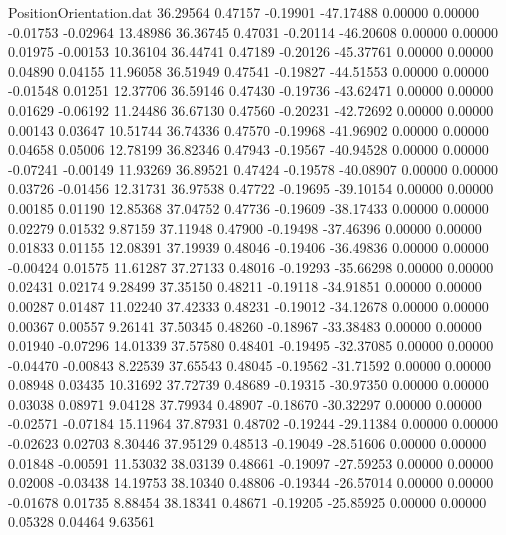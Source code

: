 \begin{filecontents}{PositionOrientation.dat}
  36.29564    0.47157   -0.19901   -47.17488    0.00000    0.00000   -0.01753   -0.02964   13.48986
  36.36745    0.47031   -0.20114   -46.20608    0.00000    0.00000    0.01975   -0.00153   10.36104
  36.44741    0.47189   -0.20126   -45.37761    0.00000    0.00000    0.04890    0.04155   11.96058
  36.51949    0.47541   -0.19827   -44.51553    0.00000    0.00000   -0.01548    0.01251   12.37706
  36.59146    0.47430   -0.19736   -43.62471    0.00000    0.00000    0.01629   -0.06192   11.24486
  36.67130    0.47560   -0.20231   -42.72692    0.00000    0.00000    0.00143    0.03647   10.51744
  36.74336    0.47570   -0.19968   -41.96902    0.00000    0.00000    0.04658    0.05006   12.78199
  36.82346    0.47943   -0.19567   -40.94528    0.00000    0.00000   -0.07241   -0.00149   11.93269
  36.89521    0.47424   -0.19578   -40.08907    0.00000    0.00000    0.03726   -0.01456   12.31731
  36.97538    0.47722   -0.19695   -39.10154    0.00000    0.00000    0.00185    0.01190   12.85368
  37.04752    0.47736   -0.19609   -38.17433    0.00000    0.00000    0.02279    0.01532    9.87159
  37.11948    0.47900   -0.19498   -37.46396    0.00000    0.00000    0.01833    0.01155   12.08391
  37.19939    0.48046   -0.19406   -36.49836    0.00000    0.00000   -0.00424    0.01575   11.61287
  37.27133    0.48016   -0.19293   -35.66298    0.00000    0.00000    0.02431    0.02174    9.28499
  37.35150    0.48211   -0.19118   -34.91851    0.00000    0.00000    0.00287    0.01487   11.02240
  37.42333    0.48231   -0.19012   -34.12678    0.00000    0.00000    0.00367    0.00557    9.26141
  37.50345    0.48260   -0.18967   -33.38483    0.00000    0.00000    0.01940   -0.07296   14.01339
  37.57580    0.48401   -0.19495   -32.37085    0.00000    0.00000   -0.04470   -0.00843    8.22539
  37.65543    0.48045   -0.19562   -31.71592    0.00000    0.00000    0.08948    0.03435   10.31692
  37.72739    0.48689   -0.19315   -30.97350    0.00000    0.00000    0.03038    0.08971    9.04128
  37.79934    0.48907   -0.18670   -30.32297    0.00000    0.00000   -0.02571   -0.07184   15.11964
  37.87931    0.48702   -0.19244   -29.11384    0.00000    0.00000   -0.02623    0.02703    8.30446
  37.95129    0.48513   -0.19049   -28.51606    0.00000    0.00000    0.01848   -0.00591   11.53032
  38.03139    0.48661   -0.19097   -27.59253    0.00000    0.00000    0.02008   -0.03438   14.19753
  38.10340    0.48806   -0.19344   -26.57014    0.00000    0.00000   -0.01678    0.01735    8.88454
  38.18341    0.48671   -0.19205   -25.85925    0.00000    0.00000    0.05328    0.04464    9.63561

\end{filecontents}
